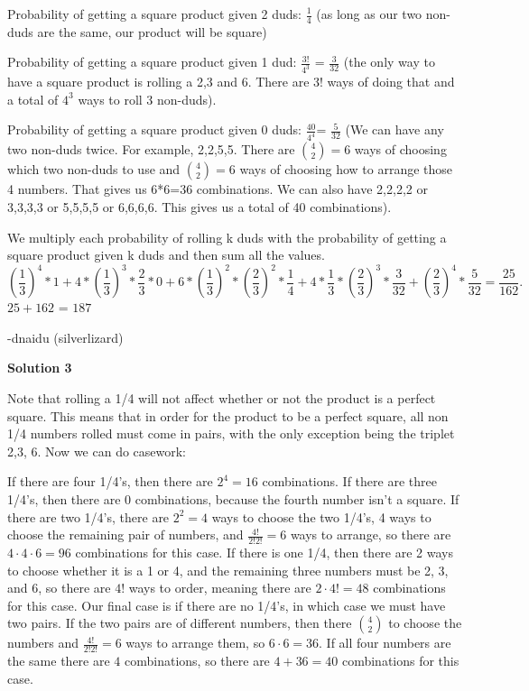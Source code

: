 \begin{enumerate}
 Probability of getting a square product given 2 duds: $\frac{1}{4}$ (as long as our two non-duds are the same, our product will be square)

 Probability of getting a square product given 1 dud: $\frac{3!}{4^3}$ =  $\frac{3}{32}$ (the only way to have a square  product is rolling a 2,3 and 6. There are 3! ways of doing that and a total of $4^3$ ways to roll 3 non-duds).

 Probability of getting a square product given 0 duds: $\frac{40}{4^4}$= $\frac{5}{32}$ (We can have any two non-duds twice. For example, 2,2,5,5. There are $\binom{4}{2} = 6$ ways of choosing which two non-duds to use and $\binom{4}{2} = 6$ ways of choosing how to arrange those 4 numbers. That gives us 6*6=36 combinations. We can also have 2,2,2,2 or 3,3,3,3 or 5,5,5,5 or 6,6,6,6. This gives us a total of 40 combinations).

 We multiply each probability of rolling k duds with the probability of getting a square product given k duds and then sum all the values.
 \[\left(\frac{1}{3}\right)^4  * 1 + 4 * \left(\frac{1}{3}\right)^3 * \frac{2}{3} * 0 + 6 * \left(\frac{1}{3}\right)^2 * \left(\frac{2}{3}\right)^2 * \frac{1}{4} + 4 * \frac{1}{3} * \left(\frac{2}{3}\right)^3 * \frac{3}{32} + \left(\frac{2}{3}\right)^4 * \frac{5}{32} = \frac{25}{162}.\]
$25+162$ = $\boxed{187}$ 

 -dnaidu (silverlizard)

 



\textbf{Solution 3}

Note that rolling a 1/4 will not affect whether or not the product is a perfect square. This means that in order for the product to be a perfect square, all non 1/4 numbers rolled must come in pairs, with the only exception being the triplet 2,3, 6. Now we can do casework:

 If there are four 1/4's, then there are $2^4=16$ combinations. If there are three 1/4's, then there are 0 combinations, because the fourth number isn't a square. If there are two 1/4's, there are $2^2=4$ ways to choose the two 1/4's, 4 ways to choose the remaining pair of numbers, and $\frac{4!}{2!2!}=6$ ways to arrange, so there are $4\cdot 4\cdot 6=96$ combinations for this case. If there is one 1/4, then there are 2 ways to choose whether it is a 1 or 4, and the remaining three numbers must be 2, 3, and 6, so there are $4!$ ways to order, meaning there are $2\cdot 4!=48$ combinations for this case. Our final case is if there are no 1/4's, in which case we must have two pairs. If the two pairs are of different numbers, then there $\binom{4}{2}$ to choose the numbers and $\frac{4!}{2!2!}=6$ ways to arrange them, so $6\cdot 6=36$. If all four numbers are the same there are $4$ combinations, so there are $4+36=40$ combinations for this case.


\end{enumerate}
